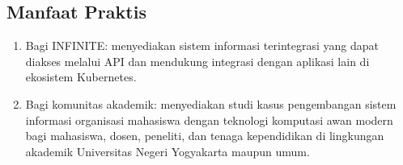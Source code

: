\subsection{Manfaat Praktis}

\begin{enumerate}[label=\alph*.]
	\item Bagi INFINITE: menyediakan sistem informasi terintegrasi yang dapat diakses melalui API dan mendukung integrasi dengan aplikasi lain di ekosistem Kubernetes.
	\item Bagi komunitas akademik: menyediakan studi kasus pengembangan sistem informasi organisasi mahasiswa dengan teknologi komputasi awan modern bagi mahasiswa, dosen, peneliti, dan tenaga kependidikan di lingkungan akademik Universitas Negeri Yogyakarta maupun umum.
\end{enumerate}
